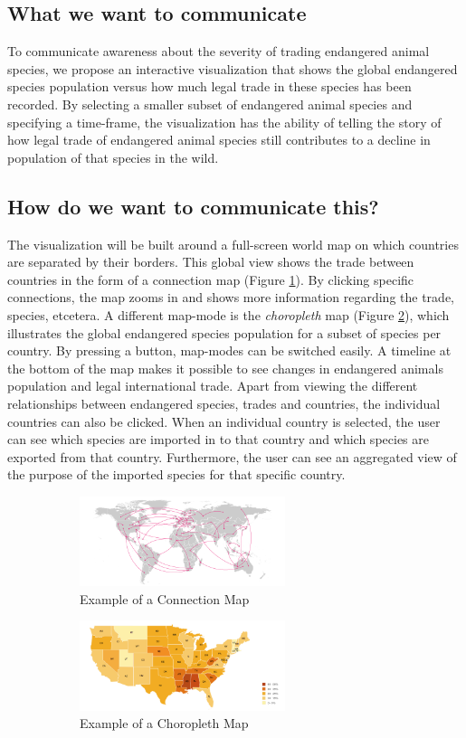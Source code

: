 \subsection{What we want to communicate}
To communicate awareness about the severity of trading endangered animal species, we propose an interactive visualization that shows the global endangered species population versus how much legal trade in these species has been recorded. By selecting a smaller subset of endangered animal species and specifying a time-frame, the visualization has the ability of telling the story of how legal trade of endangered animal species still contributes to a decline in population of that species in the wild.


\subsection{How do we want to communicate this?}
The visualization will be built around a full-screen world map on which countries are separated by their borders. This global view shows the trade between countries in the form of a connection map (Figure \ref{conmap}). By clicking specific connections, the map zooms in and shows more information regarding the trade, species, etcetera. A different map-mode is the \textit{choropleth} map (Figure \ref{choropleth}), which illustrates the global endangered species population for a subset of species per country. By pressing a button, map-modes can be switched easily. A timeline at the bottom of the map makes it possible to see changes in endangered animals population and legal international trade. 
Apart from viewing the different relationships between endangered species, trades and countries, the individual countries can also be clicked. When an individual country is selected, the user can see which species are imported in to that country and which species are exported from that country. Furthermore, the user can see an aggregated view of the purpose of the imported species for that specific country.
\begin{figure} [h]
\begin{subfigure}{.5\columnwidth}
\includegraphics[width=6cm]{images/connection_map.png}
\caption{Example of a Connection Map}
\label{conmap}
\end{subfigure}
\begin{subfigure}{.5\columnwidth}
\includegraphics[width=6cm]{images/choropleth.png}
\caption{Example of a Choropleth Map}
\label{choropleth}
\end{subfigure}
\caption{}
\label{}
\end{figure}


